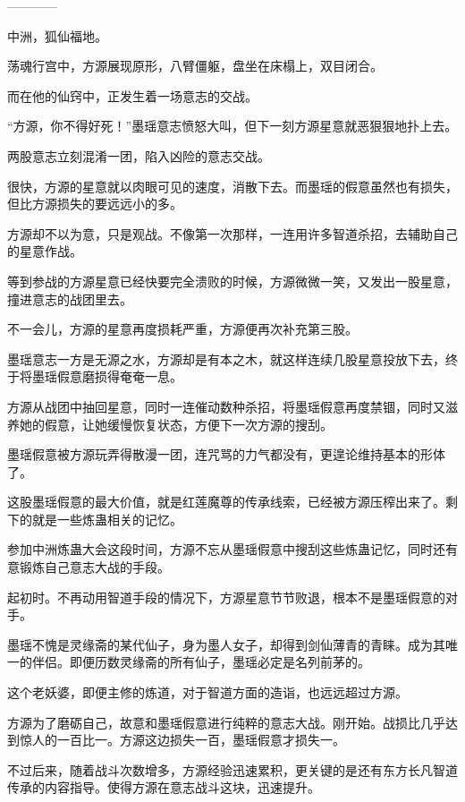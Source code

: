 
\begin{this_body}

------------

中洲，狐仙福地。

荡魂行宫中，方源展现原形，八臂僵躯，盘坐在床榻上，双目闭合。

而在他的仙窍中，正发生着一场意志的交战。

“方源，你不得好死！”墨瑶意志愤怒大叫，但下一刻方源星意就恶狠狠地扑上去。

两股意志立刻混淆一团，陷入凶险的意志交战。

很快，方源的星意就以肉眼可见的速度，消散下去。而墨瑶的假意虽然也有损失，但比方源损失的要远远小的多。

方源却不以为意，只是观战。不像第一次那样，一连用许多智道杀招，去辅助自己的星意作战。

等到参战的方源星意已经快要完全溃败的时候，方源微微一笑，又发出一股星意，撞进意志的战团里去。

不一会儿，方源的星意再度损耗严重，方源便再次补充第三股。

墨瑶意志一方是无源之水，方源却是有本之木，就这样连续几股星意投放下去，终于将墨瑶假意磨损得奄奄一息。

方源从战团中抽回星意，同时一连催动数种杀招，将墨瑶假意再度禁锢，同时又滋养她的假意，让她缓慢恢复状态，方便下一次方源的搜刮。

墨瑶假意被方源玩弄得散漫一团，连咒骂的力气都没有，更遑论维持基本的形体了。

这股墨瑶假意的最大价值，就是红莲魔尊的传承线索，已经被方源压榨出来了。剩下的就是一些炼蛊相关的记忆。

参加中洲炼蛊大会这段时间，方源不忘从墨瑶假意中搜刮这些炼蛊记忆，同时还有意锻炼自己意志大战的手段。

起初时。不再动用智道手段的情况下，方源星意节节败退，根本不是墨瑶假意的对手。

墨瑶不愧是灵缘斋的某代仙子，身为墨人女子，却得到剑仙薄青的青睐。成为其唯一的伴侣。即便历数灵缘斋的所有仙子，墨瑶必定是名列前茅的。

这个老妖婆，即便主修的炼道，对于智道方面的造诣，也远远超过方源。

方源为了磨砺自己，故意和墨瑶假意进行纯粹的意志大战。刚开始。战损比几乎达到惊人的一百比一。方源这边损失一百，墨瑶假意才损失一。

不过后来，随着战斗次数增多，方源经验迅速累积，更关键的是还有东方长凡智道传承的内容指导。使得方源在意志战斗这块，迅速提升。


\end{this_body}
